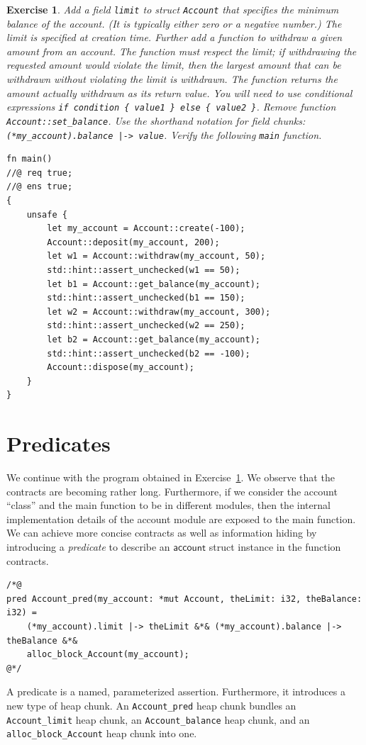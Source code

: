 \documentclass{article}
\newtheorem{exercise}{Exercise}
\begin{document}
\begin{exercise}\label{exercise:limit}
Add a field \lstinline!limit! to struct \lstinline!Account! that specifies the minimum balance of the account. (It is typically either zero or a negative number.)
The limit is specified at creation time. Further add a function
to withdraw a given amount from an account. The function must
respect the limit; if withdrawing the requested amount would violate the limit, then the largest amount that can be withdrawn without violating the limit is withdrawn. The function
returns the amount actually withdrawn as its return value. You
will need to use conditional expressions
\lstinline!if condition { value1 } else { value2 }!. Remove function
\lstinline!Account::set_balance!. Use the shorthand notation for
field chunks: \lstinline!(*my_account).balance |-> value!. Verify
the following \lstinline!main! function.
\begin{lstlisting}[basicstyle=\ttfamily\upshape]
fn main()
//@ req true;
//@ ens true;
{
    unsafe {
        let my_account = Account::create(-100);
        Account::deposit(my_account, 200);
        let w1 = Account::withdraw(my_account, 50);
        std::hint::assert_unchecked(w1 == 50);
        let b1 = Account::get_balance(my_account);
        std::hint::assert_unchecked(b1 == 150);
        let w2 = Account::withdraw(my_account, 300);
        std::hint::assert_unchecked(w2 == 250);
        let b2 = Account::get_balance(my_account);
        std::hint::assert_unchecked(b2 == -100);
        Account::dispose(my_account);
    }
}
\end{lstlisting}
\end{exercise}

\section{Predicates}

We continue with the program obtained in
Exercise~\ref{exercise:limit}. We observe that the contracts
are becoming rather long. Furthermore, if we consider the
account ``class'' and the main function to be in different
modules, then the internal implementation details of the
account module are exposed to the main function. We can achieve
more concise contracts as well as information hiding by
introducing a \emph{predicate} to describe an
$\mathsf{account}$ struct instance in the function contracts.
\begin{lstlisting}
/*@
pred Account_pred(my_account: *mut Account, theLimit: i32, theBalance: i32) =
    (*my_account).limit |-> theLimit &*& (*my_account).balance |-> theBalance &*&
    alloc_block_Account(my_account);
@*/
\end{lstlisting}
A predicate is a named, parameterized assertion. Furthermore, it introduces a new type of heap chunk.
An \lstinline!Account_pred! heap chunk bundles an \lstinline!Account_limit! heap chunk, an \lstinline!Account_balance! heap chunk,
and an \lstinline!alloc_block_Account! heap chunk into one.
\end{document}
